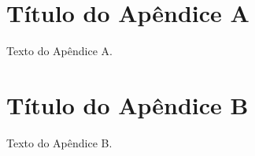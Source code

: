 
\begin{apendicesenv}
	
	\partapendices
	
	\chapter{Título do Apêndice A}
	
	Texto do Apêndice A.
	
	
	
	\chapter{Título do Apêndice B}
	
	Texto do Apêndice B.
	
	
	
	
\end{apendicesenv}
